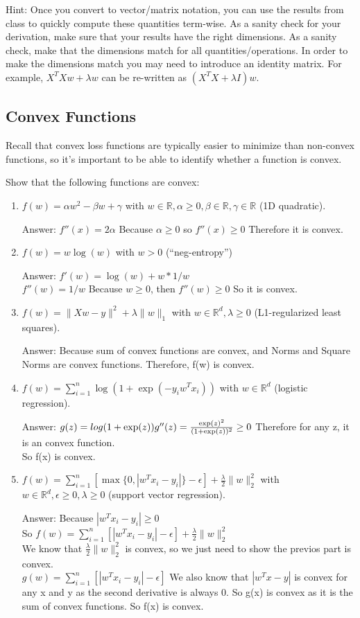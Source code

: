 \documentclass{article}
\def\ans#1{\par\gre{Answer: #1}}
\def\blu#1{{\color{blu}#1}}
\def\gre#1{{\color{gre}#1}}
\def\norm#1{\|#1\|}
\def\R{\mathbb{R}}
\def\enum#1{\begin{enumerate}#1\end{enumerate}}
\begin{document}
Hint: Once you convert to vector/matrix notation, you can use the results from class to quickly compute these quantities term-wise.
As a sanity check for your derivation, make sure that your results have the right dimensions. As a sanity check, make that the dimensions match for all quantities/operations. In order to make the dimensions match you may need to introduce an identity matrix. For example, $X^TXw + \lambda w$ can be re-written as $(X^TX + \lambda I)w$.



\subsection{Convex Functions}

Recall that convex loss functions are typically easier to minimize than non-convex functions, so it's important to be able to identify whether a function is convex.

\blu{Show that the following functions are convex}:

\enum{
\item $f(w) = \alpha w^2 - \beta w + \gamma$ with $w \in \R, \alpha \geq 0, \beta \in \R, \gamma \in \R$ (1D quadratic). \ans{$f''(x) = 2\alpha$ Because $\alpha \geq 0$ so $f''(x) \geq 0$ Therefore it is convex. }
\item $f(w) = w\log(w) $ with $w > 0$ (``neg-entropy'') \ans{$f'(w) = \log(w) + w * 1/w$ \\$f''(w) = 1/w$ Because $w\geq 0$, then $f''(w) \geq 0$ So it is convex.}
\item $f(w) = \norm{Xw-y}^2 + \lambda\norm{w}_1$ with $w \in \R^d, \lambda \geq 0$ (L1-regularized least squares). \ans{Because sum of convex functions are convex, and Norms and Square Norms are convex functions. Therefore, f(w) is convex.}
\item $f(w) = \sum_{i=1}^n \log(1+\exp(-y_iw^Tx_i)) $ with $w \in \R^d$ (logistic regression). \ans{
    $g(z) = log(1+\exp(z))\\
    g''(z) = \frac{\exp(z)^2}{(1+\exp(z))^2} \geq 0$
    Therefore for any z, it is an convex function.
    \\So f(x) is convex.
}
\item $f(w) = \sum_{i=1}^n[\max\{0,|w^Tx_i - y_i|\} - \epsilon] + \frac{\lambda}{2}\norm{w}_2^2$  with $w \in \R^d, \epsilon \geq 0, \lambda \geq 0$ (support vector regression).
\ans{ 
Because $|w^Tx_i - y_i|\geq 0$ \\
So $f(w) = \sum_{i=1}^n[|w^Tx_i - y_i| - \epsilon] + \frac{\lambda}{2}\norm{w}_2^2$\\
We know that $\frac{\lambda}{2}\norm{w}_2^2$ is convex, so we just need to show the previos part is convex.\\
$g(w) = \sum_{i=1}^n[|w^Tx_i - y_i| - \epsilon]$
We also know that $|w^Tx - y|$ is convex for any x and y as the second derivative is always 0.
So g(x) is convex as it is the sum of convex functions. 
So f(x) is convex.
}}
\end{document}
